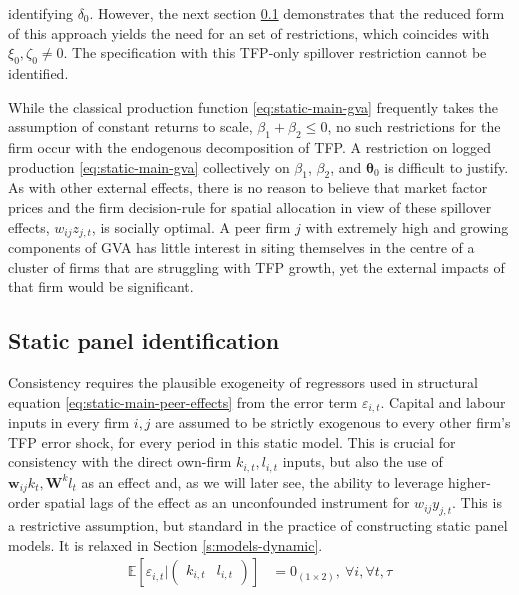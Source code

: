 identifying $\delta_0$.
However, the next section \ref{ss:static-identification} demonstrates
that the reduced form of this approach yields the need for an 
set of restrictions, which coincides with $\xi_0,\zeta_0\neq 0$.
The specification with this TFP-only spillover restriction cannot be identified.
\par
While the classical production function \eqref{eq:static-main-gva}
frequently takes the assumption of constant returns to scale,
$\beta_1 + \beta_2\leq 0$,
no such restrictions for the firm occur with the endogenous decomposition of TFP.
A restriction on logged production \eqref{eq:static-main-gva} collectively on $\beta_1$, $\beta_2$, and $\boldsymbol\theta_0$
is difficult to justify.
As with other external effects, there is no reason to believe that market factor prices
and the firm decision-rule for spatial allocation in view of these spillover effects, $w_{ij}z_{j,t}$, is socially optimal.
A peer firm $j$ with extremely high and growing components of GVA has little interest in siting themselves
in the centre of a cluster of firms that are struggling with TFP growth,
yet the external impacts of that firm would be significant.


\subsection{Static panel identification}
\label{ss:static-identification}

Consistency requires the plausible exogeneity of regressors
used in structural equation \eqref{eq:static-main-peer-effects}
from the error term $\varepsilon_{i,t}$.
Capital and labour inputs in every firm $i,j$ are assumed to be strictly exogenous
to every other firm's TFP error shock, for every period in this static model.
This is crucial for consistency with the direct own-firm $k_{i,t}, l_{i,t}$
inputs, but also the use of $\mathbf w_{ij} k_t, \mathbf W^k l_t$
as an  effect and, as we will later see,
the ability to leverage higher-order spatial lags of the  effect
as an unconfounded instrument for $w_{ij}y_{j,t}$.
This is a restrictive assumption, but standard in the practice of
constructing static panel models. It is relaxed in Section \ref{s:models-dynamic}.
\begin{align}
    \label{eq:static-identification-factor-exogeneity}
    \mathbb E[
        \varepsilon_{i,t}
        \vert
        \begin{pmatrix}
            k_{i,t} & l_{i,t}
        \end{pmatrix}
    ] &= 0_{(1\times 2)}
    ,\ \forall i, \forall t,\tau
\end{align}

